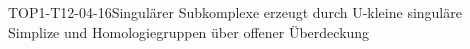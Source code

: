 
\begin{DEF}{TOP1-T12-04-16}{Singulärer Subkomplexe erzeugt durch U-kleine singuläre Simplize und Homologiegruppen über offener Überdeckung}
\end{DEF}

